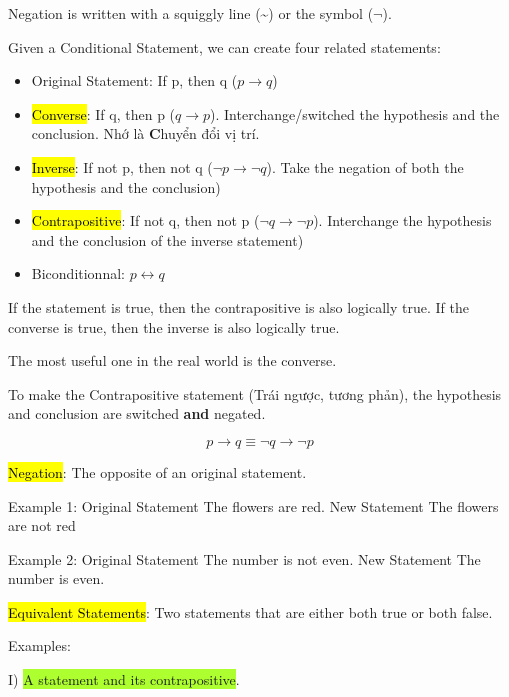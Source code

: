 Negation is written with a squiggly line (\textasciitilde) or the symbol ($\neg$).

Given a Conditional Statement, we can create four related statements:

\begin{itemize}
  \item Original Statement: If p, then q ($p \rightarrow q$)
  \item \hl{Converse}: If q, then p ($q \rightarrow p$). Interchange/switched the hypothesis and the conclusion. Nhớ  là \textbf{C}huyển đổi vị trí.
  \item \hl{Inverse}: If not p, then not q ($\neg p \rightarrow \neg q$). Take the negation of both the hypothesis and the conclusion)
  \item \hl{Contrapositive}: If not q, then not p ($\neg q \rightarrow \neg p$). Interchange the hypothesis and the conclusion of the inverse statement)
  \item Biconditionnal: $p \longleftrightarrow q$
\end{itemize}

If the statement is true, then the contrapositive is also logically true. If the converse is true, then the inverse is also logically true.

The most useful one in the real world is the converse.

\vspace{0.5cm}

To make the Contrapositive statement (Trái ngược, tương phản), the hypothesis and conclusion are switched \textbf{and} negated.

\[p \rightarrow q \equiv \neg q \rightarrow \neg p\]

\vspace{0.5cm}

\hl{Negation}: The opposite of an original statement.

Example 1: Original Statement The flowers are red. New Statement The flowers are not red

Example 2: Original Statement The number is not even. New Statement The number is even.

\vspace{.6cm}

\hl{Equivalent Statements}: Two statements that are either both true or both false.

Examples:

I) \colorbox{GreenYellow}{A statement and its contrapositive}.

